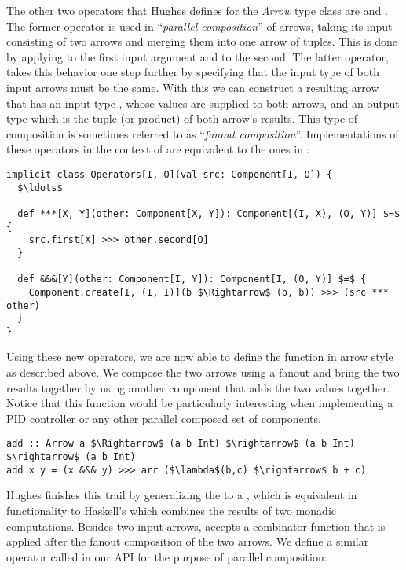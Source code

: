 The other two operators that Hughes defines for the \textit{Arrow} type class are \code{(***)} and \code{(\&\&\&)}. The former operator is used in ``\textit{parallel composition}'' of arrows, taking its input consisting of two arrows and merging them into one arrow of tuples. This is done by applying  to the first input argument and  to the second. The latter operator, takes this behavior one step further by specifying that the input type of both input arrows must be the same. With this we can construct a resulting arrow that has an input type , whose values are supplied to both arrows, and an output type which is the tuple (or product) of both arrow's results. This type of composition is sometimes referred to as ``\textit{fanout composition}''. Implementations of these operators in the context of \comp are equivalent to the ones in :

\begin{lstlisting}[style=ScalaStyle, caption={Implementations of the \textit{Arrow}'s \code{(***)} and \code{(\&\&\&)} operators}, label={lst:parallel-and-fanout}]
implicit class Operators[I, O](val src: Component[I, O]) {
  $\ldots$

  def ***[X, Y](other: Component[X, Y]): Component[(I, X), (O, Y)] $=$ {
    src.first[X] >>> other.second[O]
  }

  def &&&[Y](other: Component[I, Y]): Component[I, (O, Y)] $=$ {
    Component.create[I, (I, I)](b $\Rightarrow$ (b, b)) >>> (src *** other)
  }
}
\end{lstlisting}

Using these new operators, we are now able to define the  function in arrow style as described above. We compose the two arrows using a fanout and bring the two results together by using another component that adds the two values together. Notice that this function would be particularly interesting when implementing a PID controller or any other parallel composed set of components.

\begin{lstlisting}[style=InlineHaskellStyle]
add :: Arrow a $\Rightarrow$ (a b Int) $\rightarrow$ (a b Int) $\rightarrow$ (a b Int)
add x y = (x &&& y) >>> arr ($\lambda$(b,c) $\rightarrow$ b + c)
\end{lstlisting}

Hughes finishes this trail by generalizing the  to a , which is equivalent in functionality to Haskell's  which combines the results of two monadic computations. Besides two input arrows,  accepts a combinator function that is applied after the fanout composition of the two arrows. We define a similar operator called  in our API for the purpose of parallel composition:

